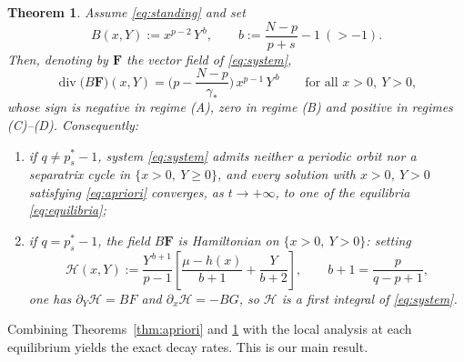 \documentclass[11pt,reqno]{amsart}
\numberwithin{equation}{section}
\theoremstyle{plain}
\newtheorem{theorem}{Theorem}[section]
\theoremstyle{definition}
\newcommand{\gs}{\gamma_{*}}
\DeclareMathOperator{\dv}{div}
\begin{document}
\begin{theorem}\label{thm:dulac}
Assume \eqref{eq:standing} and set
\begin{equation}\label{eq:B}
B(x,Y):=x^{p-2}\,Y^{\,b},\qquad b:=\frac{N-p}{p+s}-1\ (>-1).
\end{equation}
Then, denoting by $\mathbf F$ the vector field of \eqref{eq:system},
\begin{equation}\label{eq:divB}
\dv\big(B\mathbf F\big)(x,Y)
=\Big(p-\frac{N-p}{\gs}\Big)\,x^{p-1}\,Y^{\,b}
\qquad\text{for all }x>0,\ Y>0 ,
\end{equation}
whose sign is negative in regime {\rm(A)}, zero in regime {\rm(B)} and positive
in regimes {\rm(C)}--{\rm(D)}. Consequently:
\begin{enumerate}
\item[\rm(i)] if $q\ne p^{*}_{s}-1$, system \eqref{eq:system} admits neither a
periodic orbit nor a separatrix cycle in $\{x>0,\ Y\ge0\}$, and every solution
with $x>0$, $Y>0$ satisfying \eqref{eq:apriori} converges, as $t\to+\infty$, to
one of the equilibria \eqref{eq:equilibria};
\item[\rm(ii)] if $q=p^{*}_{s}-1$, the field $B\mathbf F$ is Hamiltonian on
$\{x>0,\ Y>0\}$: setting
\begin{equation}\label{eq:firstintegral}
\mathcal H(x,Y):=\frac{Y^{\,b+1}}{p-1}
\left[\frac{\mu-h(x)}{b+1}+\frac{Y}{b+2}\right],
\qquad b+1=\frac{p}{q-p+1},
\end{equation}
one has $\partial_{Y}\mathcal H=BF$ and $\partial_{x}\mathcal H=-BG$, so
$\mathcal H$ is a first integral of \eqref{eq:system}.
\end{enumerate}
\end{theorem}

Combining Theorems~\ref{thm:apriori} and \ref{thm:dulac} with the local
analysis at each equilibrium yields the exact decay rates. This is our main
result.
\end{document}
